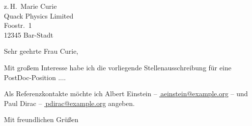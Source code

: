 \documentclass[
  parskip=half,
  fromemail,
  fromphone,
  backaddress=false,
  enlargefirstpage,
  firstfoot=false,
  foldmarks=false,
  DIV=15,
  fromalign=locationright,
]{scrlttr2}
\newcommand\mail[1]{\href{mailto:#1}{\faEnvelope[regular]\,#1}}
\begin{document}
\begin{letter}{%
  z.\,H.\ Marie Curie\\
  Quack Physics Limited\\
  Foostr.~1\\
  12345 Bar-Stadt
}%

\opening{Sehr geehrte Frau Curie,}

Mit großem Interesse habe ich die vorliegende Stellenausschreibung für eine
PostDoc-Position ....

\blindtext

\blindtext

Als Referenzkontakte möchte ich
Albert Einstein – \mail{aeinstein@example.org} –
und Paul Dirac – \mail{pdirac@example.org} angeben.

\closing{Mit freundlichen Grüßen}

\end{letter}
\end{document}

